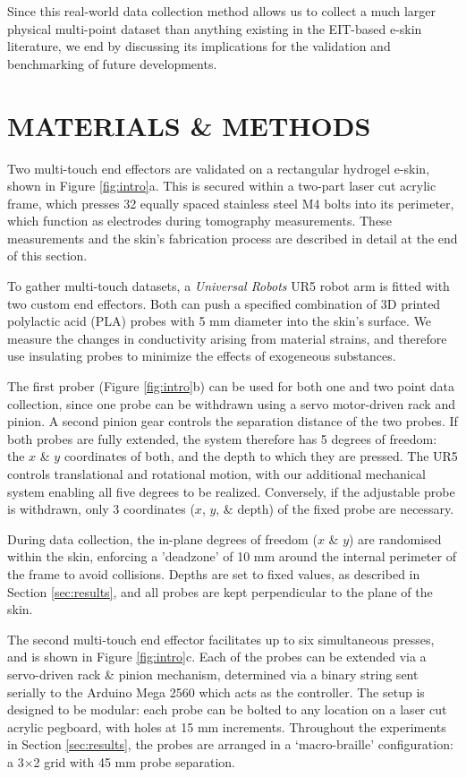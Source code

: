 Since this real-world data collection method allows us to collect a much larger physical multi-point dataset than anything existing in the EIT-based e-skin literature, we end by discussing its implications for the validation and benchmarking of future developments.

\section{MATERIALS \& METHODS} \label{sec:methods}

Two multi-touch end effectors are validated on a rectangular hydrogel e-skin, shown in Figure \ref{fig:intro}a. This is secured within a two-part laser cut acrylic frame, which presses 32 equally spaced stainless steel M4 bolts into its perimeter, which function as electrodes during tomography measurements. These measurements and the skin's fabrication process are described in detail at the end of this section.

To gather multi-touch datasets, a \textit{Universal Robots} UR5 robot arm is fitted with two custom end effectors. Both can push a specified combination of 3D printed polylactic acid (PLA) probes with 5 mm diameter into the skin's surface. We measure the changes in conductivity arising from material strains, and therefore use insulating probes to minimize the effects of exogeneous substances.

The first prober (Figure \ref{fig:intro}b) can be used for both one and two point data collection, since one probe can be withdrawn using a servo motor-driven rack and pinion. A second pinion gear controls the separation distance of the two probes. If both probes are fully extended, the system therefore has 5 degrees of freedom: the $x$ \& $y$ coordinates of both, and the depth to which they are pressed. The UR5 controls translational and rotational motion, with our additional mechanical system enabling all five degrees to be realized. Conversely, if the adjustable probe is withdrawn, only 3 coordinates ($x$, $y$, \& depth) of the fixed probe are necessary. 

During data collection, the in-plane degrees of freedom ($x$ \& $y$) are randomised within the skin, enforcing a 'deadzone' of 10 mm around the internal perimeter of the frame to avoid collisions. Depths are set to fixed values, as described in Section \ref{sec:results}, and all probes are kept perpendicular to the plane of the skin.

The second multi-touch end effector facilitates up to six simultaneous presses, and is shown in Figure \ref{fig:intro}c. Each of the probes can be extended via a servo-driven rack \& pinion mechanism, determined via a binary string sent serially to the Arduino Mega 2560 which acts as the controller. The setup is designed to be modular: each probe can be bolted to any location on a laser cut acrylic pegboard, with holes at 15 mm increments. Throughout the experiments in Section \ref{sec:results}, the probes are arranged in a `macro-braille' configuration: a 3$\times$2 grid with 45 mm probe separation. 

